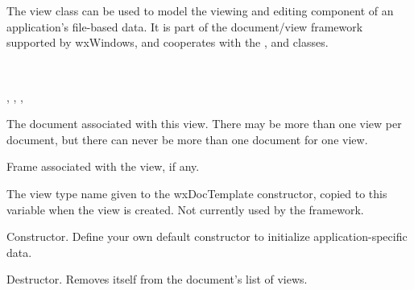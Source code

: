 \section{}\label{wxview}

The view class can be used to model the viewing and editing component of
an application's file-based data. It is part of the document/view framework supported by wxWindows,
and cooperates with the ,  
and  classes.


\\


, , ,\rtfsp
{}




The document associated with this view. There may be more than one view per
document, but there can never be more than one document for one view.



Frame associated with the view, if any.



The view type name given to the wxDocTemplate constructor, copied to this
variable when the view is created. Not currently used by the framework.



Constructor. Define your own default constructor to initialize application-specific
data.



Destructor. Removes itself from the document's list of views.

